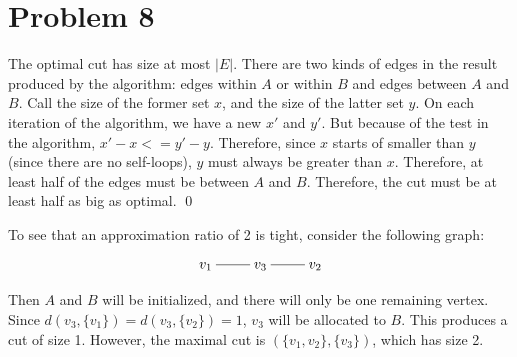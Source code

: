 \documentclass[twoside]{amsart}
\begin{document}
\section*{Problem 8}

The optimal cut has size at most $|E|$.  There are two kinds of
edges in the result produced by the algorithm: edges within $A$ or
within $B$ and edges between $A$ and $B$.  Call the size of the former
set $x$, and the size of the latter set $y$.  On each iteration of the
algorithm, we have a new $x'$ and $y'$.  But because of the test in
the algorithm, $x' - x <= y' - y$.  Therefore, since $x$ starts of
smaller than $y$ (since there are no self-loops), $y$ must always be
greater than $x$.  Therefore, at least half of the edges must be
between $A$ and $B$.  Therefore, the cut must be at least half as big
as optimal.  \qed 

To see that an approximation ratio of 2 is tight, consider the
following graph:

\[\xymatrix{
  v_1 \ar@{-}[r] & v_3 \ar@{-}[r] & v_2
}\]

Then $A$ and $B$ will be initialized, and there will only be one
remaining vertex.  Since $d(v_3,\{v_1\}) = d(v_3,\{v_2\}) = 1$, $v_3$
will be allocated to $B$.  This produces a cut of size 1.  However,
the maximal cut is $(\{v_1,v_2\},\{v_3\})$, which has size 2.
\end{document}
